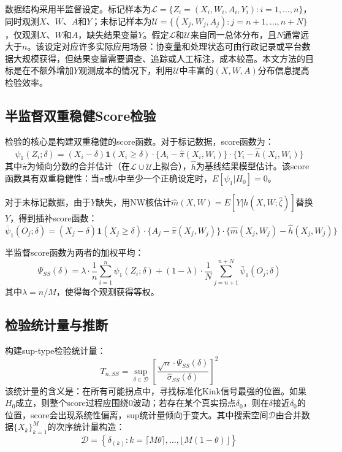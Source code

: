 \documentclass[12pt,a4paper]{ctexart}
\begin{document}
数据结构采用半监督设定。标记样本为$\mathcal{L}=\{Z_i=(X_i,W_i,A_i,Y_i): i=1,\ldots,n\}$，同时观测$X$、$W$、$A$和$Y$；未标记样本为$\mathcal{U}=\{(X_j,W_j,A_j): j=n+1,\ldots,n+N\}$，仅观测$X$、$W$和$A$，缺失结果变量$Y$。假定$\mathcal{L}$和$\mathcal{U}$来自同一总体分布，且$N$通常远大于$n$。该设定对应许多实际应用场景：协变量和处理状态可由行政记录或平台数据大规模获得，但结果变量需要调查、追踪或人工标注，成本较高。本文方法的目标是在不额外增加$Y$观测成本的情况下，利用$\mathcal{U}$中丰富的$(X,W,A)$分布信息提高检验效率。

\subsection{半监督双重稳健Score检验}

检验的核心是构建双重稳健的score函数。对于标记数据，score函数为：
\begin{equation}
\psi_1(Z_i; \delta) = (X_i - \delta)\mathbf{1}(X_i \geq \delta) \cdot \{A_i - \hat{\pi}(X_i, W_i)\} \cdot \{Y_i - \hat{h}(X_i, W_i)\}
\label{eq:score_labeled}
\end{equation}
其中$\hat{\pi}$为倾向分数的合并估计（在$\mathcal{L}\cup\mathcal{U}$上拟合），$\hat{h}$为基线结果模型估计。该score函数具有双重稳健性：当$\pi$或$h$中至少一个正确设定时，$E[\psi_1|H_0] = 0$。

对于未标记数据，由于$Y$缺失，用NW核估计$\hat{m}(X,W) = E[Y|h(X,W;\hat{\zeta})]$替换$Y$，得到插补score函数：
\begin{equation}
\bar{\psi}_1(O_j; \delta) = (X_j - \delta)\mathbf{1}(X_j \geq \delta) \cdot \{A_j - \hat{\pi}(X_j, W_j)\} \cdot \{\hat{m}(X_j, W_j) - \hat{h}(X_j, W_j)\}
\label{eq:score_unlabeled}
\end{equation}

半监督score函数为两者的加权平均：
\begin{equation}
\Psi_{SS}(\delta) = \lambda \cdot \frac{1}{n}\sum_{i=1}^{n}\psi_1(Z_i;\delta) + (1-\lambda) \cdot \frac{1}{N}\sum_{j=n+1}^{n+N}\bar{\psi}_1(O_j;\delta)
\label{eq:score_ss}
\end{equation}
其中$\lambda = n/M$，使得每个观测获得等权。

\subsection{检验统计量与推断}

构建sup-type检验统计量：
\begin{equation}
T_{n,SS} = \sup_{\delta \in \mathcal{D}} \left[\frac{\sqrt{n}\cdot\Psi_{SS}(\delta)}{\hat{\sigma}_{SS}(\delta)}\right]^2
\label{eq:test_stat}
\end{equation}
该统计量的含义是：在所有可能拐点中，寻找标准化Kink信号最强的位置。如果$H_0$成立，则整个score过程应围绕0波动；若存在某个真实拐点$\delta_0$，则在$\delta$接近$\delta_0$的位置，score会出现系统性偏离，sup统计量倾向于变大。其中搜索空间$\mathcal{D}$由合并数据$\{X_k\}_{k=1}^M$的次序统计量构造：
\begin{equation}
\mathcal{D} = \left\{\delta_{(k)} : k = \lceil M\theta \rceil, \ldots, \lfloor M(1-\theta) \rfloor\right\}
\label{eq:search_space}
\end{equation}
\end{document}
